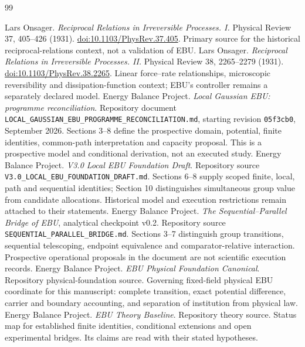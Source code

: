 \renewcommand{\bibname}{References and source map}
\begin{thebibliography}{99}
\raggedright

 Lars Onsager. \emph{Reciprocal Relations in Irreversible Processes. I.} Physical Review 37, 405--426 (1931). \href{https://doi.org/10.1103/PhysRev.37.405}{doi:10.1103/PhysRev.37.405}. Primary source for the historical reciprocal-relations context, not a validation of EBU.
 Lars Onsager. \emph{Reciprocal Relations in Irreversible Processes. II.} Physical Review 38, 2265--2279 (1931). \href{https://doi.org/10.1103/PhysRev.38.2265}{doi:10.1103/PhysRev.38.2265}. Linear force--rate relationships, microscopic reversibility and dissipation-function context; EBU's controller remains a separately declared model.
 Energy Balance Project. \emph{Local Gaussian EBU: programme reconciliation}. Repository document \texttt{LOCAL\_GAUSSIAN\_EBU\_PROGRAMME\_RECONCILIATION.md}, starting revision \texttt{05f3cb0}, September 2026. Sections 3--8 define the prospective domain, potential, finite identities, common-path interpretation and capacity proposal. This is a prospective model and conditional derivation, not an executed study.
 Energy Balance Project. \emph{V3.0 Local EBU Foundation Draft}. Repository source \texttt{V3.0\_LOCAL\_EBU\_FOUNDATION\_DRAFT.md}. Sections 6--8 supply scoped finite, local, path and sequential identities; Section 10 distinguishes simultaneous group value from candidate allocations. Historical model and execution restrictions remain attached to their statements.
 Energy Balance Project. \emph{The Sequential--Parallel Bridge of EBU}, analytical checkpoint v0.2. Repository source \texttt{SEQUENTIAL\_PARALLEL\_BRIDGE.md}. Sections 3--7 distinguish group transitions, sequential telescoping, endpoint equivalence and comparator-relative interaction. Prospective operational proposals in the document are not scientific execution records.
 Energy Balance Project. \emph{EBU Physical Foundation Canonical}. Repository physical-foundation source. Governing fixed-field physical EBU coordinate for this manuscript: complete transition, exact potential difference, carrier and boundary accounting, and separation of institution from physical law.
 Energy Balance Project. \emph{EBU Theory Baseline}. Repository theory source. Status map for established finite identities, conditional extensions and open experimental bridges. Its claims are read with their stated hypotheses.

\end{thebibliography}
